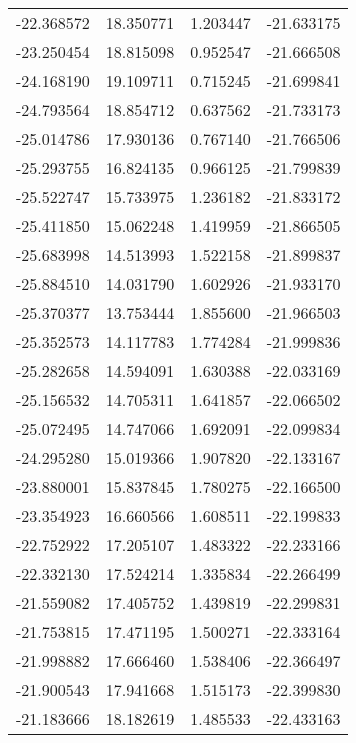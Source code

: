 \begin{tabular}{rrrr}
      -22.368572 &        18.350771 &    1.203447 & -21.633175 \\
      -23.250454 &        18.815098 &    0.952547 & -21.666508 \\
      -24.168190 &        19.109711 &    0.715245 & -21.699841 \\
      -24.793564 &        18.854712 &    0.637562 & -21.733173 \\
      -25.014786 &        17.930136 &    0.767140 & -21.766506 \\
      -25.293755 &        16.824135 &    0.966125 & -21.799839 \\
      -25.522747 &        15.733975 &    1.236182 & -21.833172 \\
      -25.411850 &        15.062248 &    1.419959 & -21.866505 \\
      -25.683998 &        14.513993 &    1.522158 & -21.899837 \\
      -25.884510 &        14.031790 &    1.602926 & -21.933170 \\
      -25.370377 &        13.753444 &    1.855600 & -21.966503 \\
      -25.352573 &        14.117783 &    1.774284 & -21.999836 \\
      -25.282658 &        14.594091 &    1.630388 & -22.033169 \\
      -25.156532 &        14.705311 &    1.641857 & -22.066502 \\
      -25.072495 &        14.747066 &    1.692091 & -22.099834 \\
      -24.295280 &        15.019366 &    1.907820 & -22.133167 \\
      -23.880001 &        15.837845 &    1.780275 & -22.166500 \\
      -23.354923 &        16.660566 &    1.608511 & -22.199833 \\
      -22.752922 &        17.205107 &    1.483322 & -22.233166 \\
      -22.332130 &        17.524214 &    1.335834 & -22.266499 \\
      -21.559082 &        17.405752 &    1.439819 & -22.299831 \\
      -21.753815 &        17.471195 &    1.500271 & -22.333164 \\
      -21.998882 &        17.666460 &    1.538406 & -22.366497 \\
      -21.900543 &        17.941668 &    1.515173 & -22.399830 \\
      -21.183666 &        18.182619 &    1.485533 & -22.433163 \\

\end{tabular}
